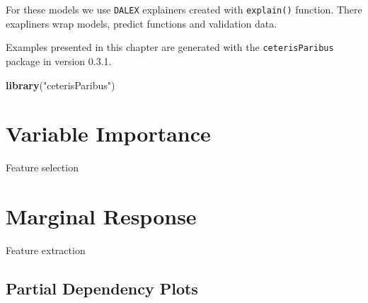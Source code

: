 \documentclass[]{book}
\newenvironment{Shaded}{\begin{snugshade}}{\end{snugshade}}
\newcommand{\DataTypeTok}[1]{\textcolor[rgb]{0.13,0.29,0.53}{#1}}
\newcommand{\DecValTok}[1]{\textcolor[rgb]{0.00,0.00,0.81}{#1}}
\newcommand{\KeywordTok}[1]{\textcolor[rgb]{0.13,0.29,0.53}{\textbf{#1}}}
\newcommand{\NormalTok}[1]{#1}
\newcommand{\OperatorTok}[1]{\textcolor[rgb]{0.81,0.36,0.00}{\textbf{#1}}}
\newcommand{\StringTok}[1]{\textcolor[rgb]{0.31,0.60,0.02}{#1}}
\theoremstyle{definition}
\theoremstyle{definition}
\theoremstyle{definition}
\theoremstyle{remark}
\begin{document}
For these models we use \texttt{DALEX} explainers created with
\texttt{explain()} function. There exapliners wrap models, predict
functions and validation data.

\begin{Shaded}
\end{Shaded}

Examples presented in this chapter are generated with the
\texttt{ceterisParibus} package in version 0.3.1.

\begin{Shaded}
\begin{Highlighting}[]
\KeywordTok{library}\NormalTok{(}\StringTok{"ceterisParibus"}\NormalTok{)}
\end{Highlighting}
\end{Shaded}

\hypertarget{variable-importance}{%
\chapter{Variable Importance}\label{variable-importance}}

Feature selection

\hypertarget{marginal-response}{%
\chapter{Marginal Response}\label{marginal-response}}

Feature extraction

\hypertarget{partial-dependency-plots}{%
\section{Partial Dependency Plots}\label{partial-dependency-plots}}
\end{document}
